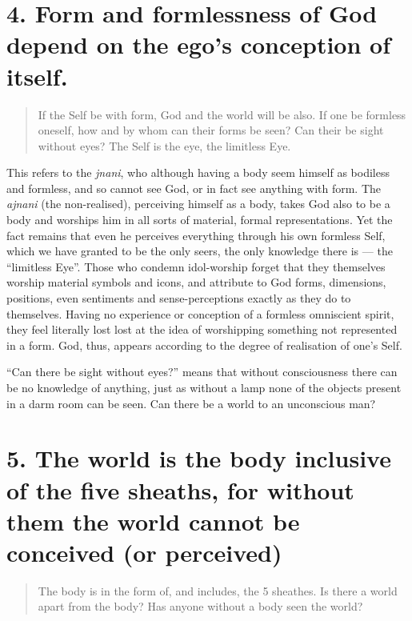 \documentclass[12pt]{report}
\begin{document}
\section{4. Form and formlessness of God depend on the ego's
  conception of itself.}

\begin{quote}
  If the Self be with form, God and the world will be also. If one be
  formless oneself, how and by whom can their forms be seen? Can their
  be sight without eyes? The Self is the eye, the limitless Eye.
\end{quote}


This refers to the \emph{jnani}, who although having a body seem
himself as bodiless and formless, and so cannot see God, or in fact
see anything with form. The \emph{ajnani} (the non-realised),
perceiving himself as a body, takes God also to be a body and worships
him in all sorts of material, formal representations. Yet the fact
remains that even he perceives everything through his own formless
Self, which we have granted to be the only seers, the only knowledge
there is --- the ``limitless Eye''. Those who condemn idol-worship
forget that they themselves worship material symbols and icons, and
attribute to God forms, dimensions, positions, even sentiments and
sense-perceptions exactly as they do to themselves. Having no
experience or conception of a formless omniscient spirit, they feel
literally lost lost at the idea of worshipping something not
represented in a form. God, thus, appears according to the degree of
realisation of one's Self.

``Can there be sight without eyes?'' means that without consciousness
there can be no knowledge of anything, just as without a lamp none of
the objects present in a darm room can be seen. Can there be a world
to an unconscious man?

\section{5. The world is the body inclusive of the five sheaths, for
  without them the world cannot be conceived (or perceived)}

\begin{quote}
  The body is in the form of, and includes, the 5 sheathes. Is there a
  world apart from the body? Has anyone without a body seen the world?
\end{quote}
\end{document}
